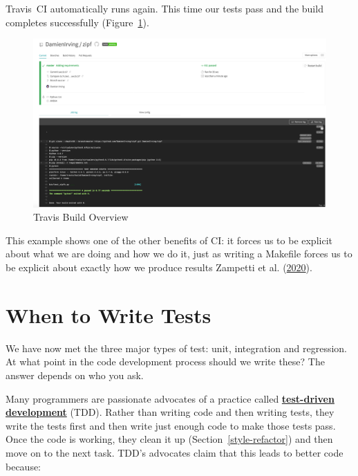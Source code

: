 \documentclass[
]{krantz}
\newcommand{\gref}[2]{\hyperlink{#2}{\textbf{#1}}}
\begin{document}
Travis~CI automatically runs again.
This time our tests pass and the build completes successfully
(Figure~\ref{fig:testing-build-pass}).

\begin{figure}

{\centering \includegraphics[width=1\linewidth]{figures/testing/travis-build-pass} 

}

\caption{Travis Build Overview}\label{fig:testing-build-pass}
\end{figure}

This example shows one of the other benefits of CI:
it forces us to be explicit about what we are doing and how we do it,
just as writing a Makefile forces us to be explicit about exactly how we produce results Zampetti et al. (\protect\hyperlink{ref-Zamp2020}{2020}).

\hypertarget{testing-tdd}{%
\section{When to Write Tests}\label{testing-tdd}}

We have now met the three major types of test: unit, integration and regression.
At what point in the code development process should we write these?
The answer depends on who you ask.

Many programmers are passionate advocates of a practice called
\gref{test-driven development}{tdd}
(TDD).
Rather than writing code and then writing tests,
they write the tests first and then write just enough code to make those tests pass.
Once the code is working,
they clean it up (Section~\ref{style-refactor}) and then move on to the next task.
TDD's advocates claim that this leads to better code because:
\end{document}
